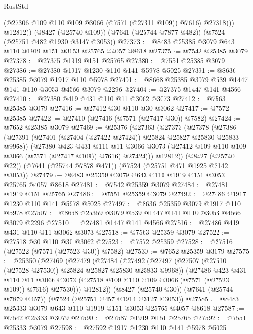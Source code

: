 \begin{lexlean}{RustStd}
\begin{coremodule}
{\begin{coremodule}
{{{{{{{{{{{{{{{{{{{{{{{{{{{{{{{{              (@27306 @109 @110 @109 @3066 (@7571 (@27311 @109)) @7616)
              @27318)))
        @12812))
    (@8427 (@25740 @109))
    (@7641 (@25744 @7877 @482))
    (@7524 (@25751 @482 @1930 @3147 @3053))
@27373 := @8483 @25385 @3079 @643 @110 @1919 @151 @3053 @25765 @4057 @8618
@27375 := @7542 @25385 @3079
@27378 := @27375 @1919 @151 @25765
@27380 := @7551 @25385 @3079
@27386 := @27380 @1917 @1230 @110 @141 @5978 @5025
@27391 := @8636 @25385 @3079 @1917 @110 @5978
@27401 := @8668 @25385 @3079 @539 @1447 @141 @110 @3053 @4566 @3079 @2296
@27404 := @27375 @1447 @141 @4566
@27410 := @27380 @419 @431 @110 @11 @3062 @3073
@27412 := @7563 @25385 @3079
@27416 := @27412 @30 @110 @30 @3062
@27417 := @7572 @25385
@27422 := @27410 (@27416 (@7571 (@27417 @30)) @7582)
@27424 := @7652 @25385 @3079
@27469 := @25376
    (@27363
      (@27373
        (@27378
          (@27386
            (@27391 (@27401 (@27404 (@27422 @27424)) @25824 @25827 @25830 @25833 @9968))
            (@27380
              @423
              @431
              @110
              @11
              @3066
              @3073
              (@27412 @109 @110 @109 @3066 (@7571 (@27417 @109)) @7616)
              @27424)))
        @12812))
    (@8427 (@25740 @22))
    (@7641 (@25744 @7878 @471))
    (@7524 (@25751 @471 @1925 @3142 @3053))
@27479 := @8483 @25359 @3079 @643 @110 @1919 @151 @3053 @25765 @4057 @8618
@27481 := @7542 @25359 @3079
@27484 := @27481 @1919 @151 @25765
@27486 := @7551 @25359 @3079
@27492 := @27486 @1917 @1230 @110 @141 @5978 @5025
@27497 := @8636 @25359 @3079 @1917 @110 @5978
@27507 := @8668 @25359 @3079 @539 @1447 @141 @110 @3053 @4566 @3079 @2296
@27510 := @27481 @1447 @141 @4566
@27516 := @27486 @419 @431 @110 @11 @3062 @3073
@27518 := @7563 @25359 @3079
@27522 := @27518 @30 @110 @30 @3062
@27523 := @7572 @25359
@27528 := @27516 (@27522 (@7571 (@27523 @30)) @7582)
@27530 := @7652 @25359 @3079
@27575 := @25350
    (@27469
      (@27479
        (@27484
          (@27492
            (@27497 (@27507 (@27510 (@27528 @27530)) @25824 @25827 @25830 @25833 @9968))
            (@27486
              @423
              @431
              @110
              @11
              @3066
              @3073
              (@27518 @109 @110 @109 @3066 (@7571 (@27523 @109)) @7616)
              @27530)))
        @12812))
    (@8427 (@25740 @30))
    (@7641 (@25744 @7879 @457))
    (@7524 (@25751 @457 @1914 @3127 @3053))
@27585 := @8483 @25333 @3079 @643 @110 @1919 @151 @3053 @25765 @4057 @8618
@27587 := @7542 @25333 @3079
@27590 := @27587 @1919 @151 @25765
@27592 := @7551 @25333 @3079
@27598 := @27592 @1917 @1230 @110 @141 @5978 @5025
}}}}}}}}}}}}}}}}}}}}}}}}}}}}}}}}
\end{coremodule}}
\end{coremodule}
\end{lexlean}
